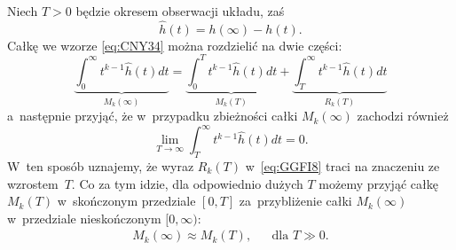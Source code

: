 \documentclass[paper=a4,DIV=12]{lpas}
\begin{document}
\begin{appendices}
  Niech $T > 0$ będzie okresem obserwacji układu, zaś
  \begin{equation}
    \hat{h}(t) = h(\infty) - h(t).
    \label{eq:7S9M3}
  \end{equation}
  Całkę we wzorze \eqref{eq:CNY34} można rozdzielić na dwie części:
  \begin{equation}
    \underbrace{\int_0^{\infty} t^{k-1}\hat{h}(t) dt}_{M_k(\infty)}
      = \underbrace{\int_0^{T} t^{k-1}\hat{h}(t) dt}_{M_k(T)}
      + \underbrace{\int_{T}^{\infty} t^{k-1}\hat{h}(t) dt}_{R_k(T)}
    \label{eq:GGFI8}
  \end{equation}
  a~następnie przyjąć, że w~przypadku zbieżności całki $M_k(\infty)$ zachodzi
  również
  \begin{equation}
    \lim_{T \to \infty}\int_T^{\infty}{t^{k-1} \hat{h}(t) dt} = 0.
    \label{eq:DITCB}
  \end{equation}
  W~ten sposób uznajemy, że wyraz $R_k(T)$ w~\eqref{eq:GGFI8} traci na znaczeniu
  ze wzrostem~$T$. Co za tym idzie, dla odpowiednio dużych $T$ możemy przyjąć
  całkę $M_k(T)$ w~skończonym przedziale $[0,T]$ za~przybliżenie całki
  $M_k(\infty)$ w~przedziale nieskończonym $[0,\infty)$:
 \begin{equation}
   \begin{aligned}
      &M_k(\infty) \approx M_k(T), && \text{dla } T \gg 0.&
   \end{aligned}
   \label{eq:MZ4XJ}
 \end{equation}


\end{appendices}
\end{document}
